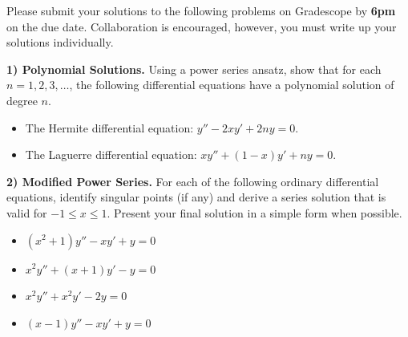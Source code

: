\documentclass[12pt]{article}
\begin{document}
\noindent
Please submit your solutions to the following problems on Gradescope by \textbf{6pm} on the due date. Collaboration is encouraged, however, you must write up your solutions individually.

\bigskip

\noindent
\textbf{1) Polynomial Solutions.} Using a power series ansatz, show that for each $n=1,2,3,\ldots$, the following differential equations have a polynomial solution of degree $n$.

\begin{itemize}
\item[(a)] The Hermite differential equation: $y''-2xy'+2ny=0$.

\item[(b)] The Laguerre differential equation: $xy''+(1-x)y'+ny=0$.

\end{itemize}

\noindent
\textbf{2) Modified Power Series.} For each of the following ordinary differential equations, identify singular points (if any) and derive a series solution that is valid for $-1\leq x\leq 1$. Present your final solution in a simple form when possible.

\begin{itemize}
\item[(a)] $(x^2+1)y'' - xy' + y = 0$

\item[(b)] $x^2y'' + (x+1)y' - y = 0$

\item[(c)] $x^2y'' + x^2y' - 2y = 0$

\item[(d)] $(x-1)y'' - xy' + y= 0$

\end{itemize}
\end{document}
